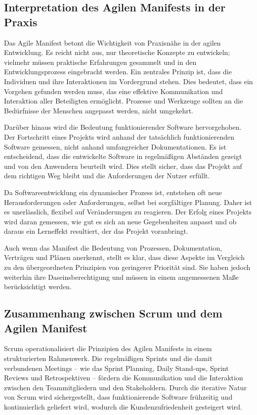 \subsection{Interpretation des Agilen Manifests in der Praxis}
Das Agile Manifest betont die Wichtigkeit von Praxisnähe in der agilen Entwicklung. Es reicht nicht aus, nur theoretische Konzepte zu entwickeln; vielmehr müssen praktische Erfahrungen gesammelt und in den Entwicklungsprozess eingebracht werden. Ein zentrales Prinzip ist, dass die Individuen und ihre Interaktionen im Vordergrund stehen. Dies bedeutet, dass ein Vorgehen gefunden werden muss, das eine effektive Kommunikation und Interaktion aller Beteiligten ermöglicht. Prozesse und Werkzeuge sollten an die Bedürfnisse der Menschen angepasst werden, nicht umgekehrt.

Darüber hinaus wird die Bedeutung funktionierender Software hervorgehoben. Der Fortschritt eines Projekts wird anhand der tatsächlich funktionierenden Software gemessen, nicht anhand umfangreicher Dokumentationen. Es ist entscheidend, dass die entwickelte Software in regelmäßigen Abständen gezeigt und von den Anwendern beurteilt wird. Dies stellt sicher, dass das Projekt auf dem richtigen Weg bleibt und die Anforderungen der Nutzer erfüllt.

Da Softwareentwicklung ein dynamischer Prozess ist, entstehen oft neue Herausforderungen oder Anforderungen, selbst bei sorgfältiger Planung. Daher ist es unerlässlich, flexibel auf Veränderungen zu reagieren. Der Erfolg eines Projekts wird daran gemessen, wie gut es sich an neue Gegebenheiten anpasst und ob daraus ein Lerneffekt resultiert, der das Projekt voranbringt.

Auch wenn das Manifest die Bedeutung von Prozessen, Dokumentation, Verträgen und Plänen anerkennt, stellt es klar, dass diese Aspekte im Vergleich zu den übergeordneten Prinzipien von geringerer Priorität sind. Sie haben jedoch weiterhin ihre Daseinsberechtigung und müssen in einem angemessenen Maße berücksichtigt werden. \cite{Wolf2011}

\subsection{Zusammenhang zwischen Scrum und dem Agilen Manifest}
Scrum operationalisiert die Prinzipien des Agilen Manifests in einem strukturierten Rahmenwerk. Die regelmäßigen Sprints und die damit verbundenen Meetings – wie das Sprint Planning, Daily Stand-ups, Sprint Reviews und Retrospektiven – fördern die Kommunikation und die Interaktion zwischen den Teammitgliedern und den Stakeholdern. Durch die iterative Natur von Scrum wird sichergestellt, dass funktionierende Software frühzeitig und kontinuierlich geliefert wird, wodurch die Kundenzufriedenheit gesteigert wird.

